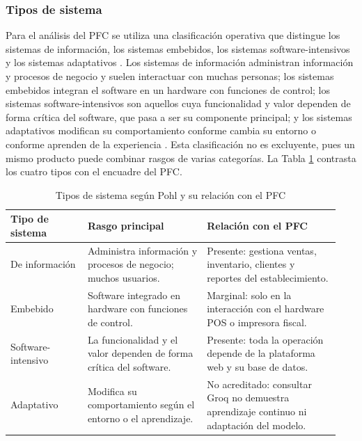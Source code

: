 \documentclass[onecolumn,12pt,a4paper]{IEEEtran}
\begin{document}
\subsubsection{Tipos de sistema}
Para el an\'alisis del PFC se utiliza una clasificaci\'on operativa que distingue los sistemas de informaci\'on, los sistemas embebidos, los sistemas software-intensivos y los sistemas adaptativos \cite{pohl2025}. Los sistemas de informaci\'on administran informaci\'on y procesos de negocio y suelen interactuar con muchas personas; los sistemas embebidos integran el software en un hardware con funciones de control; los sistemas software-intensivos son aquellos cuya funcionalidad y valor dependen de forma cr\'itica del software, que pasa a ser su componente principal; y los sistemas adaptativos modifican su comportamiento conforme cambia su entorno o conforme aprenden de la experiencia \cite{pohl2025}. Esta clasificaci\'on no es excluyente, pues un mismo producto puede combinar rasgos de varias categor\'ias. La Tabla \ref{tab:tipos} contrasta los cuatro tipos con el encuadre del PFC.

\begin{table}[htbp]
\caption{Tipos de sistema seg\'un Pohl y su relaci\'on con el PFC}
\label{tab:tipos}
\centering
\footnotesize
\begin{tabular}{@{}p{0.22\linewidth}p{0.34\linewidth}p{0.38\linewidth}@{}}
\toprule
\textbf{Tipo de sistema} & \textbf{Rasgo principal} & \textbf{Relaci\'on con el PFC}\\
\midrule
De informaci\'on & Administra informaci\'on y procesos de negocio; muchos usuarios. & Presente: gestiona ventas, inventario, clientes y reportes del establecimiento.\\
Embebido & Software integrado en hardware con funciones de control. & Marginal: solo en la interacci\'on con el hardware POS o impresora fiscal.\\
Software-intensivo & La funcionalidad y el valor dependen de forma cr\'itica del software. & Presente: toda la operaci\'on depende de la plataforma web y su base de datos.\\
Adaptativo & Modifica su comportamiento seg\'un el entorno o el aprendizaje. & No acreditado: consultar Groq no demuestra aprendizaje continuo ni adaptaci\'on del modelo.\\
\bottomrule
\end{tabular}
\end{table}
\end{document}
